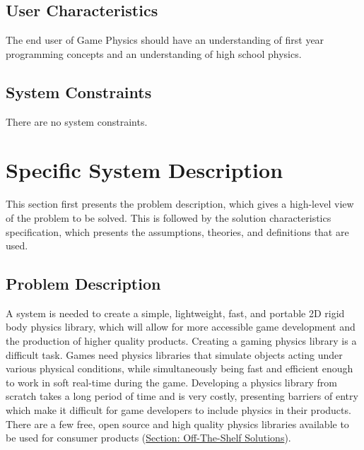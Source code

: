 \documentclass[12pt]{article}
\begin{document}
\subsection{User Characteristics}
\label{Sec:UserChars}
The end user of Game Physics should have an understanding of first year programming concepts and an understanding of high school physics.
\subsection{System Constraints}
\label{Sec:SysConstraints}
There are no system constraints.
\section{Specific System Description}
\label{Sec:SpecSystDesc}
This section first presents the problem description, which gives a high-level view of the problem to be solved. This is followed by the solution characteristics specification, which presents the assumptions, theories, and definitions that are used.
\subsection{Problem Description}
\label{Sec:ProbDesc}
A system is needed to create a simple, lightweight, fast, and portable 2D rigid body physics library, which will allow for more accessible game development and the production of higher quality products. Creating a gaming physics library is a difficult task. Games need physics libraries that simulate objects acting under various physical conditions, while simultaneously being fast and efficient enough to work in soft real-time during the game. Developing a physics library from scratch takes a long period of time and is very costly, presenting barriers of entry which make it difficult for game developers to include physics in their products. There are a few free, open source and high quality physics libraries available to be used for consumer products (\hyperref[Sec:offShelfSolns]{Section: Off-The-Shelf Solutions}).
\end{document}
